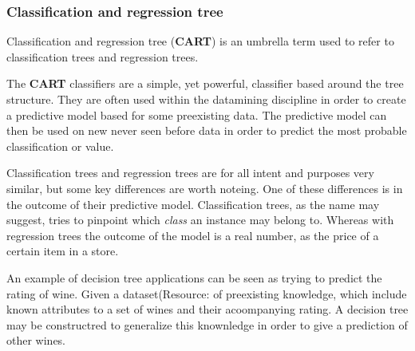 \subsubsection{Classification and regression tree}
	Classification and regression tree (\textbf{CART}) is an umbrella term used to refer to
	classification trees and regression trees.\cite{trees:umbrella}

	\bigskip\noindent The \textbf{CART} classifiers are a simple, yet powerful, classifier based around the tree structure. 
	They are often used within the datamining discipline in order to create a predictive model based for some preexisting data.
	The predictive model can then be used on new never seen before data in order to predict the most probable classification or value. 
	
	\bigskip\noindent Classification trees and regression trees are for all intent and purposes very similar, but some key differences are worth noteing. 
	One of these differences is in the outcome of their predictive model. 
	Classification trees, as the name may suggest, tries to pinpoint which \textit{class} an instance may belong to. 
	Whereas with regression trees the outcome of the model is a real number, as the price of a certain item in a store. 
	
	\bigskip\noindent
	An example of decision tree applications can be seen as trying to predict the rating of wine. 
	Given a dataset(Resource: \cite{mining:datasetexample} of preexisting knowledge, which include known attributes to a set of wines and their acoompanying rating.
	A decision tree may be constructred to generalize this knownledge in order to give a prediction of other wines. 	
		
